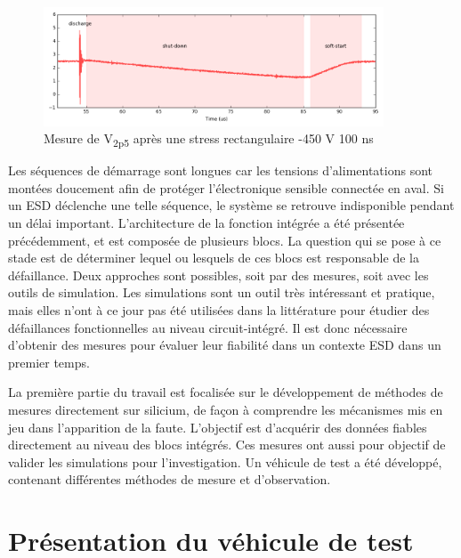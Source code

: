 \begin{figure}[!h]
  \centering
  \includegraphics[width=0.9\textwidth]{src/1/figures/v2p5_measure.png}
  \caption{Mesure de V\textsubscript{2p5} après une stress rectangulaire -450 V 100 ns}
  \label{fig:meas-reset-v2p5}
\end{figure}

Les séquences de démarrage sont longues car les tensions d'alimentations sont montées doucement afin de protéger l'électronique sensible connectée en aval.
Si un ESD déclenche une telle séquence, le système se retrouve indisponible pendant un délai important.
L'architecture de la fonction intégrée a été présentée précédemment, et est composée de plusieurs blocs.
La question qui se pose à ce stade est de déterminer lequel ou lesquels de ces blocs est responsable de la défaillance.
Deux approches sont possibles, soit par des mesures, soit avec les outils de simulation.
Les simulations sont un outil très intéressant et pratique, mais elles n'ont à ce jour pas été utilisées dans la littérature pour étudier des défaillances fonctionnelles au niveau circuit-intégré.
Il est donc nécessaire d'obtenir des mesures pour évaluer leur fiabilité dans un contexte ESD dans un premier temps.

La première partie du travail est focalisée sur le développement de méthodes de mesures directement sur silicium, de façon à comprendre les mécanismes mis en jeu dans l'apparition de la faute.
L'objectif est d'acquérir des données fiables directement au niveau des blocs intégrés.
Ces mesures ont aussi pour objectif de valider les simulations pour l'investigation.
Un véhicule de test a été développé, contenant différentes méthodes de mesure et d'observation.

\section{Présentation du véhicule de test}

